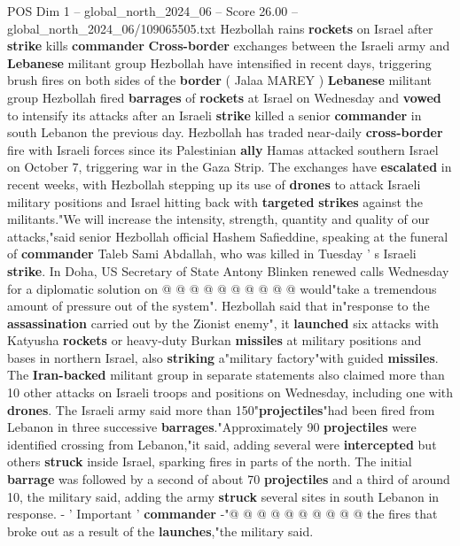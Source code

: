 \begin{textsample}{POS Dim 1 – global\_north\_2024\_06 – Score 26.00 – global\_north\_2024\_06/109065505.txt}  \label{ex:f1_pos_311}
Hezbollah rains \textbf{rockets} on Israel after \textbf{strike} kills \textbf{commander} \textbf{Cross-border} exchanges between the Israeli army and \textbf{Lebanese} militant group Hezbollah have intensified in recent days, triggering brush fires on both sides of the \textbf{border} ( Jalaa MAREY ) \textbf{Lebanese} militant group Hezbollah fired \textbf{barrages} of \textbf{rockets} at Israel on Wednesday and \textbf{vowed} to intensify its attacks after an Israeli \textbf{strike} killed a senior \textbf{commander} in south Lebanon the previous day.
Hezbollah has traded near-daily \textbf{cross-border} fire with Israeli forces since its Palestinian \textbf{ally} Hamas attacked southern Israel on October 7, triggering war in the Gaza Strip.
The exchanges have \textbf{escalated} in recent weeks, with Hezbollah stepping up its use of \textbf{drones} to attack Israeli military positions and Israel hitting back with \textbf{targeted} \textbf{strikes} against the militants."We will increase the intensity, strength, quantity and quality of our attacks,"said senior Hezbollah official Hashem Safieddine, speaking at the funeral of \textbf{commander} Taleb Sami Abdallah, who was killed in Tuesday ' s Israeli \textbf{strike}.
In Doha, US Secretary of State Antony Blinken renewed calls Wednesday for a diplomatic solution on @ @ @ @ @ @ @ @ @ @ would"take a tremendous amount of pressure out of the system".
Hezbollah said that in"response to the \textbf{assassination} carried out by the Zionist enemy", it \textbf{launched} six attacks with Katyusha \textbf{rockets} or heavy-duty Burkan \textbf{missiles} at military positions and bases in northern Israel, also \textbf{striking} a"military factory"with guided \textbf{missiles}.
The \textbf{Iran-backed} militant group in separate statements also claimed more than 10 other attacks on Israeli troops and positions on Wednesday, including one with \textbf{drones}.
The Israeli army said more than 150"\textbf{projectiles}"had been fired from Lebanon in three successive \textbf{barrages}."Approximately 90 \textbf{projectiles} were identified crossing from Lebanon,"it said, adding several were \textbf{intercepted} but others \textbf{struck} inside Israel, sparking fires in parts of the north.
The initial \textbf{barrage} was followed by a second of about 70 \textbf{projectiles} and a third of around 10, the military said, adding the army \textbf{struck} several sites in south Lebanon in response. - ' Important ' \textbf{commander} -"@ @ @ @ @ @ @ @ @ @ the fires that broke out as a result of the \textbf{launches},"the military said.

\end{textsample}
